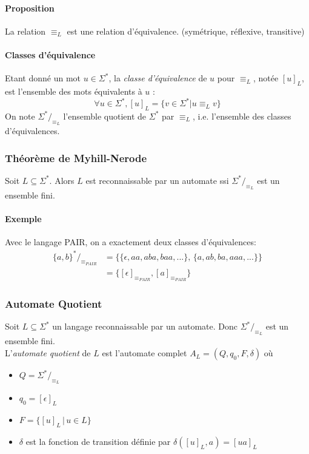 \documentclass[a4paper]{article}
\begin{document}
  \paragraph{Proposition} La relation $\equiv_L$ est une relation d'équivalence. 
  (symétrique, réflexive, transitive)

  \paragraph{Classes d'équivalence}
  Etant donné un mot $u \in \Sigma^*$, la \textit{classe d'équivalence} de $u$ pour
  $\equiv_L$, notée $[u]_L$, est l'ensemble des mots équivalents à $u$ :
  $$ \forall u \in \Sigma^*, [u]_L = \{v \in \Sigma^* | u \equiv_L v\}$$
  On note $\Sigma^*/_{\equiv_L}$ l'ensemble quotient de $\Sigma^*$ par $\equiv_L$, 
  i.e. l'ensemble des classes d'équivalences.

  \subsubsection{Théorème de Myhill-Nerode}
  Soit $L \subseteq \Sigma^*$. Alors $L$ est reconnaissable par un automate 
  ssi $\Sigma^*/_{\equiv_L}$ est un ensemble fini.
  
  \paragraph{Exemple} Avec le langage PAIR, on a exactement deux classes d'équivalences:
  \begin{align*}
    \{a,b\}^*/_{\equiv_{PAIR}} & = \{ \{\epsilon, aa, aba, baa,...\},\, \{a, ab, ba, aaa,...\} \}\\
    & = \{[\epsilon]_{\equiv_{PAIR}}, [a]_{\equiv_{PAIR}}\}
  \end{align*}

  \subsubsection{Automate Quotient}
  Soit $L \subseteq \Sigma^*$ un langage reconnaissable par un automate. 
  Donc $\Sigma^*/_{\equiv_L}$ est un ensemble fini.\\

  L'\textit{automate quotient} de $L$ est l'automate complet $A_L = (Q, q_0, F, \delta)$ où
  \begin{itemize}
    \item $Q = \Sigma^*/_{\equiv_L}$
    \item $q_0 = [\epsilon]_L$
    \item $F = \{ [u]_L\, |\, u \in L \}$
    \item $\delta$ est la fonction de transition définie par $\delta([u]_L, a) = [ua]_L$
  \end{itemize}
\end{document}
